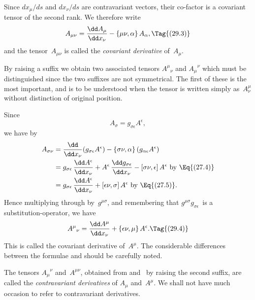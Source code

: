 \documentclass[12pt]{book}
\begin{document}
Since $dx_{\mu}/ds$ and $dx_{\nu}/ds$ are contravariant vectors, their co\hyp{}factor is a
covariant tensor of the second rank. We therefore write
\[
A_{\mu\nu} = \frac{\dd A_{\mu}}{\dd x_{\nu}} - \{\mu\nu, \alpha\}\, A_{\alpha},
\Tag{(29.3)}
\]
and the tensor~$A_{\mu\nu}$ is called the \emph{covariant derivative} of~$A_{\mu}$.

By raising a suffix we obtain two associated tensors ${A^{\mu}}_{\nu}$ and ${A_{\mu}}^{\nu}$ which
must be distinguished since the two suffixes are not symmetrical. The first
of these is the most important, and is to be understood when the tensor
is written simply as~$A_{\nu}^{\mu}$ without distinction of original position.

Since
\[
A_{\sigma} = g_{\sigma\epsilon} A^{\epsilon},
\]
we have by~
\begin{align*}
  A_{\sigma\nu}
  &= \frac{\dd}{\dd x_{\nu}} (g_{\sigma\epsilon} A^{\epsilon}) - \{\sigma\nu, \alpha\}\, (g_{\alpha\epsilon} A^{\epsilon}) \\
  &= g_{\sigma\epsilon}\, \frac{\dd A^{\epsilon}}{\dd x_{\nu}} + A^{\epsilon}\, \frac{\dd g_{\sigma\epsilon}}{\dd x_{\nu}} - [\sigma\nu, \epsilon]\, A^{\epsilon} \text{ by~\Eq{(27.4)}} \\
  &= g_{\sigma\epsilon}\, \frac{\dd A^{\epsilon}}{\dd x_{\nu}} + [\epsilon\nu, \sigma]\, A^{\epsilon} \text{ by~\Eq{(27.5)}.}
\end{align*}
Hence multiplying through by~$g^{\mu\sigma}$, and remembering that $g^{\mu\sigma}g_{\sigma\epsilon}$~is a
substitution\hyp{}operator, we have
\[
{A^{\mu}}_{\nu} = \frac{\dd A^{\mu}}{\dd x_{\nu}} + \{\epsilon\nu, \mu\}\, A^{\epsilon}.
\Tag{(29.4)}
\]
This is called the covariant derivative of~$A^{\mu}$. The considerable differences
%
%
%
between the formulae  and  should be carefully noted.

The tensors ${A_{\mu}}^{\nu}$ and~$A^{\mu\nu}$, obtained from  and~ by raising the
second suffix, are called the \emph{contravariant derivatives} of $A_{\mu}$ and~$A^{\mu}$. We shall
%
not have much occasion to refer to contravariant derivatives.

\end{document}
